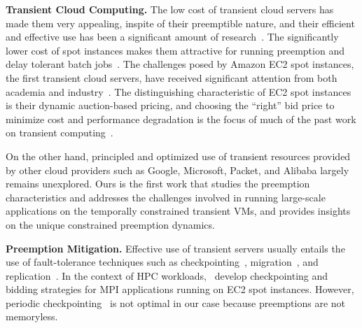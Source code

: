 \noindent \textbf{Transient Cloud Computing.}
The low cost of transient cloud servers has made them very appealing, inspite of their preemptible nature, and their efficient and effective use has been a significant amount of research~\cite{prateek-thesis}. 
The significantly lower cost of spot instances makes them attractive for running preemption and delay tolerant batch jobs~\cite{spoton, jain14demand, yi2010reducing, conductor, liu-spot, spot-run, dubois2016optispot, varshney_autobot_2019, harlap2018tributary}.
The challenges posed by Amazon EC2 spot instances, the first transient cloud servers, have received significant attention from both academia  and industry~\cite{spotinst}. 
The distinguishing characteristic of EC2 spot instances is their dynamic auction-based pricing, and choosing the ``right'' bid price to minimize cost and performance degradation is the focus of much of the past work on transient computing~\cite{bidding4,mihailescu2012impact,bidding7,bidding1,bidding8,bidding3,bidding6,bid-cloud,bidding5,wolski_probabilistic_2017, guo_bidding_2015}.


On the other hand, principled and optimized use of transient resources provided by other cloud providers such as Google, Microsoft, Packet, and Alibaba largely remains unexplored.
%
%
Ours is the first work that studies the preemption characteristics and addresses the challenges involved in running large-scale applications on the temporally constrained  transient VMs, and provides insights on the unique constrained preemption dynamics. %

\noindent \textbf{Preemption Mitigation.}
Effective use of transient servers usually entails the use of fault-tolerance techniques such as checkpointing~\cite{flint}, migration~\cite{spotcheck}, and replication~\cite{spoton}. 
In the context of HPC workloads,~\cite{marathe2014exploiting,gong_monetary_2015,xiang_spotmpi:_2011} develop checkpointing and bidding strategies for MPI applications running on EC2 spot instances.
However, periodic checkpointing~\cite{dongarra_fault_nodate, bougeret_checkpointing_2011} is not optimal in our case because preemptions are not memoryless. 

